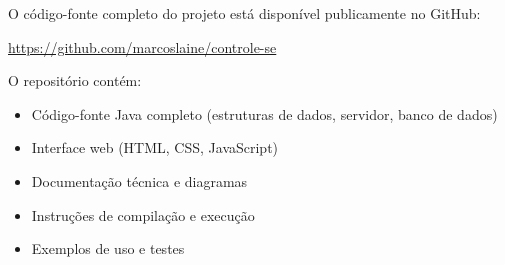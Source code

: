 \documentclass[12pt,a4paper]{article}
\begin{document}
O código-fonte completo do projeto está disponível publicamente no GitHub:

\begin{center}
\url{https://github.com/marcoslaine/controle-se}
\end{center}

\noindent O repositório contém:
\begin{itemize}
  \item Código-fonte Java completo (estruturas de dados, servidor, banco de dados)
  \item Interface web (HTML, CSS, JavaScript)
  \item Documentação técnica e diagramas
  \item Instruções de compilação e execução
  \item Exemplos de uso e testes
\end{itemize}
\end{document}
